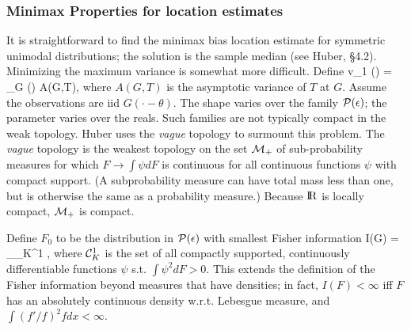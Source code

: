 \subsubsection{Minimax Properties for location estimates}
It is straightforward to find the minimax bias location estimate for symmetric
unimodal distributions; the solution is the sample median (see Huber, \S4.2).
Minimizing the maximum variance is somewhat more difficult.
Define
\beq
    v_1 (\epsilon) = \sup_{G \in \calP(\epsilon)} A(G,T),
\eeq
where
$A(G,T)$ is the asymptotic variance of $T$ at $G$.
Assume the observations are iid $G( \cdot - \theta)$.  The
shape varies over the family ${\cal P}(\epsilon)$; the parameter varies over the
reals.
Such families are not typically compact in the weak topology.  Huber uses
the {\em vague} topology to surmount this problem.
The {\em vague} topology is the weakest topology on the set ${\cal M}_+$ of
sub-probability measures for which $F \rightarrow \int \psi dF$
is continuous for all continuous functions $\psi$ with compact support.
(A subprobability measure can have total mass less than one, but is otherwise the same
as a probability measure.)
Because $\hbox{I\kern-.17em\hbox{R}}$ is locally compact, ${\cal M}_+$ is compact.

Define $F_0$ to be the distribution in ${\cal P}(\epsilon)$ with smallest
Fisher information
\beq
    I(G) = \sup_{\psi \in \calC_K^1} ,
\eeq
where ${\cal C}_K^1$ is the set of all compactly supported,
continuously differentiable functions $\psi$ s.t. $\int \psi^2 dF > 0$.
This extends the definition of the Fisher information beyond measures that
have densities; in fact,
$I(F) < \infty$ iff $F$ has an absolutely continuous density w.r.t. Lebesgue measure,
and $\int (f'/f)^2 f dx < \infty$.

